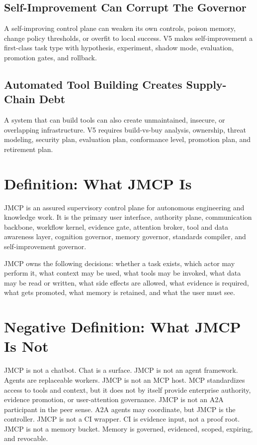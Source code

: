 \documentclass[10pt,journal,onecolumn]{IEEEtran}
\begin{document}
\subsection{Self-Improvement Can Corrupt The Governor}
A self-improving control plane can weaken its own controls, poison memory, change policy thresholds, or overfit to local success. V5 makes self-improvement a first-class task type with hypothesis, experiment, shadow mode, evaluation, promotion gates, and rollback.

\subsection{Automated Tool Building Creates Supply-Chain Debt}
A system that can build tools can also create unmaintained, insecure, or overlapping infrastructure. V5 requires build-vs-buy analysis, ownership, threat modeling, security plan, evaluation plan, conformance level, promotion plan, and retirement plan.

\section{Definition: What JMCP Is}
JMCP is an assured supervisory control plane for autonomous engineering and knowledge work. It is the primary user interface, authority plane, communication backbone, workflow kernel, evidence gate, attention broker, tool and data awareness layer, cognition governor, memory governor, standards compiler, and self-improvement governor.

JMCP owns the following decisions: whether a task exists, which actor may perform it, what context may be used, what tools may be invoked, what data may be read or written, what side effects are allowed, what evidence is required, what gets promoted, what memory is retained, and what the user must see.

\section{Negative Definition: What JMCP Is Not}
JMCP is not a chatbot. Chat is a surface. JMCP is not an agent framework. Agents are replaceable workers. JMCP is not an MCP host. MCP standardizes access to tools and context, but it does not by itself provide enterprise authority, evidence promotion, or user-attention governance. JMCP is not an A2A participant in the peer sense. A2A agents may coordinate, but JMCP is the controller. JMCP is not a CI wrapper. CI is evidence input, not a proof root. JMCP is not a memory bucket. Memory is governed, evidenced, scoped, expiring, and revocable.
\end{document}
